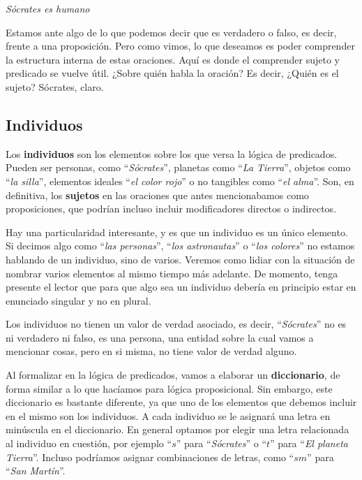 \begin{example}
    \textit{Sócrates es humano}
\end{example}

Estamos ante algo de lo que podemos decir que es verdadero o falso, es decir, frente a una proposición. Pero como vimos, lo que deseamos es poder comprender la estructura interna de estas oraciones. Aquí es donde el comprender sujeto y predicado se vuelve útil. ¿Sobre quién habla la oración? Es decir, ¿Quién es el sujeto? Sócrates, claro.

\subsection{Individuos}
\label{chap:logica_predicados:subsec:individuos}

Los \textbf{individuos} son los elementos sobre los que versa la lógica de predicados. Pueden ser personas, como ``\textit{Sócrates}'', planetas como ``\textit{La Tierra}'', objetos como ``\textit{la silla}'', elementos ideales ``\textit{el color rojo}'' o no tangibles como ``\textit{el alma}''. Son, en definitiva, los \textbf{sujetos} en las oraciones que antes mencionabamos como proposiciones, que podrían incluso incluir modificadores directos o indirectos.

Hay una particularidad interesante, y es que un individuo es un único elemento. Si decimos algo como ``\textit{las personas}'', ``\textit{los astronautas}'' o
``\textit{los colores}'' no estamos hablando de un individuo, sino de varios. Veremos como lidiar con la situación de nombrar varios elementos al mismo tiempo más adelante. De momento, tenga presente el lector que para que algo sea un individuo debería en principio estar en enunciado singular y no en plural.

Los individuos no tienen un valor de verdad asociado, es decir,
``\textit{Sócrates}'' no es ni verdadero ni falso, es una persona, una entidad sobre la cual vamos a mencionar cosas, pero en si misma, no tiene valor de verdad alguno.

Al formalizar en la lógica de predicados, vamos a elaborar un \textbf{diccionario}, de forma similar a lo que hacíamos para lógica proposicional. Sin embargo, este diccionario es bastante diferente, ya que uno de los elementos que debemos incluir en el mismo son los individuos. A cada individuo se le asignará una letra en minúscula en el diccionario. En general optamos por elegir una letra relacionada al individuo en cuestión, por ejemplo ``\textit{$s$}'' para ``\textit{Sócrates}'' o  ``\textit{$t$}'' para ``\textit{El planeta Tierra}''. Incluso podríamos asignar combinaciones de letras, como ``\textit{$sm$}'' para ``\textit{San Martín}''.

